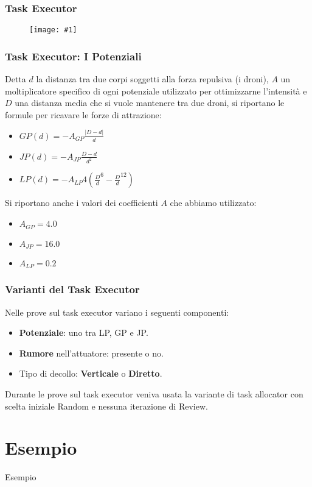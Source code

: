 \documentclass{beamer}
\newcommand{\putimage}[2] {
  \begin{figure}[H]
    \centering
    \texttt{[image: \#1]}
	\end{figure}
}
\begin{document}
\begin{frame}
\frametitle{Task Executor}
\putimage{images/task-executor.png}{0.99}
\end{frame}

\begin{frame}
\frametitle{Task Executor: I Potenziali}
Detta $d$ la distanza tra due corpi soggetti alla forza repulsiva (i droni), $A$ un moltiplicatore specifico di ogni potenziale utilizzato per ottimizzarne l'intensit\`a e $D$ una distanza media che si vuole mantenere tra due droni, si riportano le formule per ricavare le forze di attrazione:

\begin{itemize}
  \item $GP(d) = -A_{GP} \frac {|D - d|} {d}$
  \item $JP(d) = -A_{JP} \frac {D - d} {d^2}$
  \item $LP(d) = -A_{LP} 4 ({\frac {D} {d}}^6 - {\frac {D} {d}}^{12})$
\end{itemize}

Si riportano anche i valori dei coefficienti $A$ che abbiamo utilizzato:

\begin{itemize}
  \item $A_{GP} = 4.0$
  \item $A_{JP} = 16.0$
  \item $A_{LP} = 0.2$
\end{itemize}
\end{frame}

\begin{frame}
\frametitle{Varianti del Task Executor}
Nelle prove sul task executor variano i seguenti componenti:

\begin{itemize}
  \item \textbf{Potenziale}: uno tra LP, GP e JP.
  \item \textbf{Rumore} nell'attuatore: presente o no.
  \item Tipo di decollo: \textbf{Verticale} o \textbf{Diretto}.
\end{itemize}

Durante le prove sul task executor veniva usata la variante di task allocator con scelta iniziale Random e nessuna iterazione di Review.
\end{frame}

\section{Esempio}
\begin{frame}
\centering
\Huge
Esempio
\end{frame}
\end{document}
